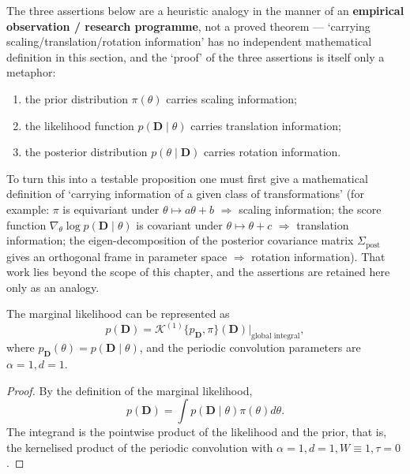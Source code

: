\begin{remark}\label{thm:bayesian_grammar_correspondence}
The three assertions below are a heuristic analogy in the manner of an \textbf{empirical observation / research programme}, not a proved theorem --- `carrying scaling/translation/rotation information' has no independent mathematical definition in this section, and the `proof' of the three assertions is itself only a metaphor:
\begin{enumerate}[label=(\roman*)]
    \item the prior distribution $\pi(\theta)$ carries scaling information;
    \item the likelihood function $p(\mathbf D\mid\theta)$ carries translation information;
    \item the posterior distribution $p(\theta\mid\mathbf D)$ carries rotation information.
\end{enumerate}
To turn this into a testable proposition one must first give a mathematical definition of `carrying information of a given class of transformations' (for example: $\pi$ is equivariant under $\theta\mapsto a\theta+b$ $\Rightarrow$ scaling information; the score function $\nabla_\theta\log p(\mathbf D\mid\theta)$ is covariant under $\theta\mapsto\theta+c$ $\Rightarrow$ translation information; the eigen-decomposition of the posterior covariance matrix $\Sigma_{\mathrm{post}}$ gives an orthogonal frame in parameter space $\Rightarrow$ rotation information). That work lies beyond the scope of this chapter, and the assertions are retained here only as an analogy.
\end{remark}

\begin{proposition}\label{prop:marginal_likelihood_periodic_transform}
The marginal likelihood can be represented as
\[
p(\mathbf D)=\mathcal K^{(1)}\{p_{\mathbf D},\pi\}(\mathbf D)\big|_{\text{global integral}},
\]
where $p_{\mathbf D}(\theta)=p(\mathbf D\mid\theta)$, and the periodic convolution parameters are $\alpha=1,d=1$.
\end{proposition}

\begin{proof}
By the definition of the marginal likelihood,
\[
p(\mathbf D)=\int p(\mathbf D\mid\theta)\pi(\theta)d\theta.
\]
The integrand is the pointwise product of the likelihood and the prior, that is, the kernelised product of the periodic convolution with $\alpha=1,d=1,W\equiv1,\tau=0$.
\end{proof}

